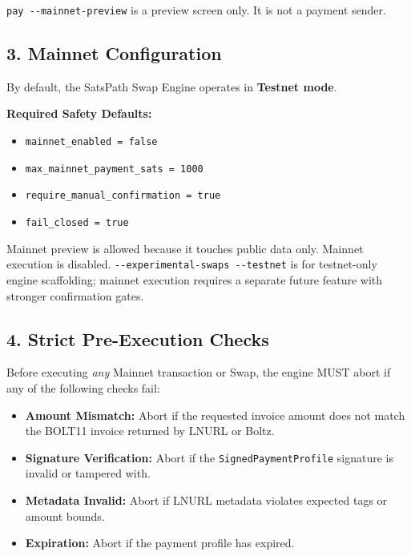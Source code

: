\documentclass[
]{article}
\providecommand{\tightlist}{%
  \setlength{\itemsep}{0pt}\setlength{\parskip}{0pt}}
\begin{document}
\texttt{pay\ -\/-mainnet-preview} is a preview screen only. It is not a
payment sender.

\hypertarget{mainnet-configuration}{%
\subsection{3. Mainnet Configuration}\label{mainnet-configuration}}

By default, the SatsPath Swap Engine operates in \textbf{Testnet mode}.

\textbf{Required Safety Defaults:}

\begin{itemize}
\tightlist
\item
  \texttt{mainnet\_enabled\ =\ false}
\item
  \texttt{max\_mainnet\_payment\_sats\ =\ 1000}
\item
  \texttt{require\_manual\_confirmation\ =\ true}
\item
  \texttt{fail\_closed\ =\ true}
\end{itemize}

Mainnet preview is allowed because it touches public data only. Mainnet
execution is disabled. \texttt{-\/-experimental-swaps\ -\/-testnet} is
for testnet-only engine scaffolding; mainnet execution requires a
separate future feature with stronger confirmation gates.

\hypertarget{strict-pre-execution-checks}{%
\subsection{4. Strict Pre-Execution
Checks}\label{strict-pre-execution-checks}}

Before executing \emph{any} Mainnet transaction or Swap, the engine MUST
abort if any of the following checks fail:

\begin{itemize}
\tightlist
\item
  \textbf{Amount Mismatch:} Abort if the requested invoice amount does
  not match the BOLT11 invoice returned by LNURL or Boltz.
\item
  \textbf{Signature Verification:} Abort if the
  \texttt{SignedPaymentProfile} signature is invalid or tampered with.
\item
  \textbf{Metadata Invalid:} Abort if LNURL metadata violates expected
  tags or amount bounds.
\item
  \textbf{Expiration:} Abort if the payment profile has expired.
\end{itemize}
\end{document}
